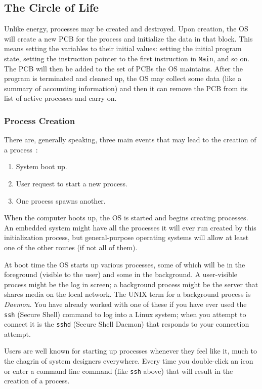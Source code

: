 \subsection*{The Circle of Life}

Unlike energy, processes may be created and destroyed. Upon creation, the OS will create a new PCB for the process and initialize the data in that block. This means setting the variables to their initial values: setting the initial program state, setting the instruction pointer to the first instruction in \texttt{Main}, and so on.  The PCB will then be added to the set of PCBs the OS maintains. After the program is terminated and cleaned up, the OS may collect some data (like a summary of accounting information) and then it can remove the PCB from its list of active processes and carry on.

\subsubsection*{Process Creation}
There are, generally speaking, three main events that may lead to the creation of a process~\cite{mos}:

\begin{enumerate}
	\item System boot up.
	\item User request to start a new process.
	\item One process spawns another.
\end{enumerate}

When the computer boots up, the OS is started and begins creating processes. An embedded system might have all the processes it will ever run created by this initialization process, but general-purpose operating systems will allow at least one of the other routes (if not all of them).

At boot time the OS starts up various processes, some of which will be in the foreground (visible to the user) and some in the background. A user-visible process might be the log in screen; a background process might be the server that shares media on the local network. The UNIX term for a background process is \textit{Daemon}. You have already worked with one of these if you have ever used the \texttt{ssh} (Secure Shell) command to log into a Linux system; when you attempt to connect it is the \texttt{sshd} (Secure Shell Daemon) that responds to your connection attempt.

Users are well known for starting up processes whenever they feel like it, much to the chagrin of system designers everywhere. Every time you double-click an icon or enter a command line command (like \texttt{ssh} above) that will result in the creation of a process. 

